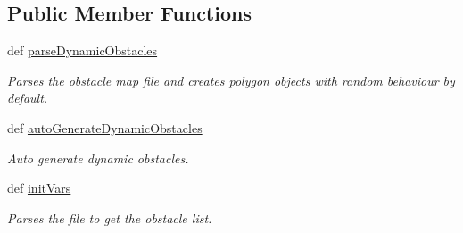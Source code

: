 \subsection*{Public Member Functions}
\begin{DoxyCompactItemize}
\item 
def \hyperlink{classconfiguration_1_1PolyFileConfiguration_ac8bb24acf90ad65983d676e096843b94}{parse\-Dynamic\-Obstacles}
\begin{DoxyCompactList}\small\item\em Parses the obstacle map file and creates polygon objects with random behaviour by default. \end{DoxyCompactList}\item 
def \hyperlink{classconfiguration_1_1PolyFileConfiguration_a4da9ae8ba4a2123e905c9887c2616115}{auto\-Generate\-Dynamic\-Obstacles}
\begin{DoxyCompactList}\small\item\em Auto generate dynamic obstacles. \end{DoxyCompactList}\item 
def \hyperlink{classconfiguration_1_1PolyFileConfiguration_ad68553a7fd263204c69800782fdd03a8}{init\-Vars}
\begin{DoxyCompactList}\small\item\em Parses the file to get the obstacle list. \end{DoxyCompactList}\end{DoxyCompactItemize}
